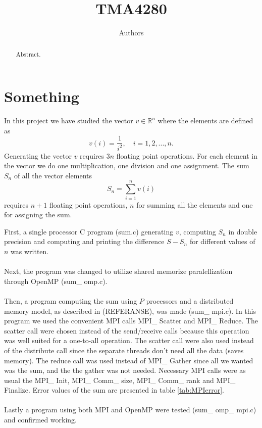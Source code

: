 \documentclass{article}
\title{TMA4280}
\author{Authors}
\begin{document}
\maketitle

\begin{abstract}
Abstract. 
\end{abstract}

\newpage
\section*{Something}
In this project we have studied the vector $v \in \mathbb{R}^n$ where the elements are defined as 
\begin{equation}
\label{vdefinition}
	v(i) =\frac{1}{i^2},\quad i = 1,2,...,n.
\end{equation}
Generating the vector $v$ requires $3n$ floating point operations. For each element in the vector we do one multiplication, one division and one assignment.  
The sum $S_n$ of all the vector elements 
\begin{equation}
\label{Sdefinition}
	S_n = \sum_{i=1}^n v(i)
\end{equation}
requires $n+1$ floating point operations, $n$ for summing all the elements and one for assigning the sum.

First, a single processor C program (sum.c) generating $v$, computing $S_n$ in double precision and computing and printing the difference $S - S_n$ for different values of $n$ was written. 
\\\\
Next, the program was changed to utilize shared memorize paralellization through OpenMP (sum\_ omp.c). 
\\\\
Then, a program computing the sum using $P$ processors and a distributed memory model, as described in (REFERANSE), was made (sum\_ mpi.c). In this program we used the convenient MPI calls MPI\_ Scatter and MPI\_ Reduce. The scatter call were chosen instead of the send/receive calls because this operation was well suited for a one-to-all operation. The scatter call were also used instead of the distribute call since the separate threads don't need all the data (saves memory). The reduce call was used instead of MPI\_ Gather since all we wanted was the sum, and the the gather was not needed. Necessary MPI calls were as usual the MPI\_ Init, MPI\_ Comm\_ size, MPI\_ Comm\_ rank and MPI\_ Finalize. Error values of the sum are presented in table \ref{tab:MPIerror}.
\\\\
Lastly a program using both MPI and OpenMP were tested (sum\_ omp\_ mpi.c) and confirmed working.
\end{document}
